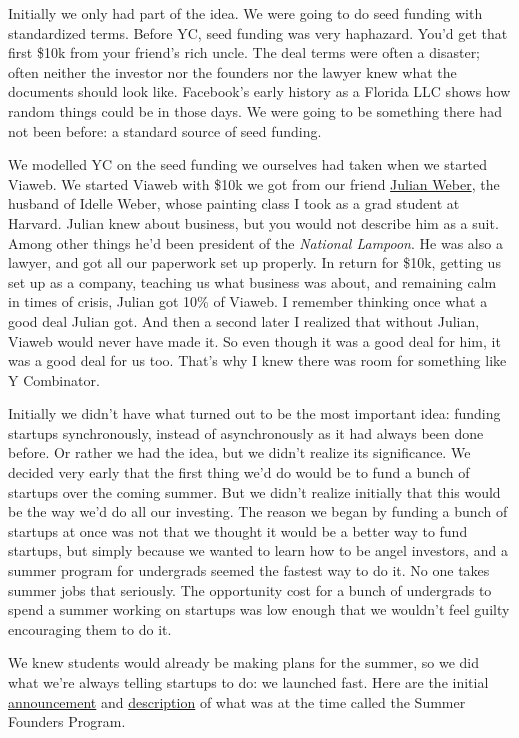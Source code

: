 Initially we only had part of the idea. We were going to do seed funding
with standardized terms. Before YC, seed funding was very haphazard.
You'd get that first \$10k from your friend's rich uncle. The deal terms
were often a disaster; often neither the investor nor the founders nor
the lawyer knew what the documents should look like. Facebook's early
history as a Florida LLC shows how random things could be in those days.
We were going to be something there had not been before: a standard
source of seed funding.

We modelled YC on the seed funding we ourselves had taken when we
started Viaweb. We started Viaweb with \$10k we got from our friend
\href{julian.html}{Julian Weber}, the husband of Idelle Weber, whose
painting class I took as a grad student at Harvard. Julian knew about
business, but you would not describe him as a suit. Among other things
he'd been president of the \emph{National Lampoon}. He was also a
lawyer, and got all our paperwork set up properly. In return for \$10k,
getting us set up as a company, teaching us what business was about, and
remaining calm in times of crisis, Julian got 10\% of Viaweb. I remember
thinking once what a good deal Julian got. And then a second later I
realized that without Julian, Viaweb would never have made it. So even
though it was a good deal for him, it was a good deal for us too. That's
why I knew there was room for something like Y Combinator.

Initially we didn't have what turned out to be the most important idea:
funding startups synchronously, instead of asynchronously as it had
always been done before. Or rather we had the idea, but we didn't
realize its significance. We decided very early that the first thing
we'd do would be to fund a bunch of startups over the coming summer. But
we didn't realize initially that this would be the way we'd do all our
investing. The reason we began by funding a bunch of startups at once
was not that we thought it would be a better way to fund startups, but
simply because we wanted to learn how to be angel investors, and a
summer program for undergrads seemed the fastest way to do it. No one
takes summer jobs that seriously. The opportunity cost for a bunch of
undergrads to spend a summer working on startups was low enough that we
wouldn't feel guilty encouraging them to do it.

We knew students would already be making plans for the summer, so we did
what we're always telling startups to do: we launched fast. Here are the
initial \href{summerfounder.html}{announcement} and
\href{https://web.archive.org/web/20170609055553/http://ycombinator.com/old/sfp.html}{description}
of what was at the time called the Summer Founders Program.

